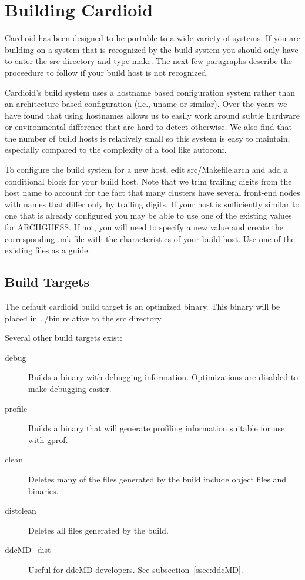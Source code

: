 \documentclass{article}
\begin{document}
\def\path#1{#1}

\section{Building Cardioid}

Cardioid has been designed to be portable to a wide variety of systems.
If you are building on a system that is recognized by the build system
you should only have to enter the src directory and type make.  The next
few paragraphs describe the proceedure to follow if your build host is
not recognized.

Cardioid's build system uses a hostname based configuration system
rather than an architecture based configuration (i.e., uname or
similar).  Over the years we have found that using hostnames allows us
to easily work around subtle hardware or environmental difference that
are hard to detect otherwise.  We also find that the number of build
hosts is relatively small so this system is easy to maintain, especially
compared to the complexity of a tool like autoconf.

To configure the build system for a new host, edit
\path{src/Makefile.arch} and add a conditional block for your build
host.  Note that we trim trailing digits from the host name to account
for the fact that many clusters have several front-end nodes with names
that differ only by trailing digits.  If your host is sufficiently
similar to one that is already configured you may be able to use one of
the existing values for ARCHGUESS.  If not, you will need to specify a
new value and create the corresponding \path{.mk} file with the
characteristics of your build host.  Use one of the existing files as a
guide.

\subsection{Build Targets}

The default cardioid build target is an optimized binary.  This binary
will be placed in \path{../bin} relative to the \path{src} directory.

Several other build targets exist:
\par\noindent
\begin{description}
\item[debug]  Builds a binary with debugging information.  Optimizations are
  disabled to make debugging easier.
\item[profile] Builds a binary that will generate profiling information
  suitable for use with gprof.
\item[clean]  Deletes many of the files generated by the build include
  object files and binaries.
\item[distclean] Deletes all files generated by the build.
\item[ddcMD\_dist] Useful for ddcMD developers.  See
  subsection~\ref{ssec:ddcMD}.
\end{description}
\end{document}
